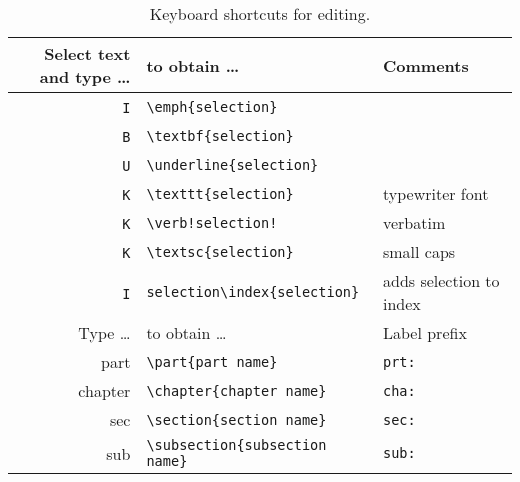\documentclass[10pt]{article}
\begin{document}
\begin{table}
\centering
\caption{Keyboard shortcuts for editing.}
\begin{tabular}{r|l|l}
	Select text and type \dots   & to obtain \dots                        & Comments                \\
	\hline
	\cmdkey~\texttt{I}           & \verb!\emph{selection}!                &                         \\
	\cmdkey~\texttt{B}           & \verb!\textbf{selection}!              &                         \\
	\cmdkey~\texttt{U}           & \verb!\underline{selection}!           &                         \\
	\cmdkey~\texttt{K}           & \verb!\texttt{selection}!              & typewriter font         \\
	\cmdkey~\optkey~\texttt{K}   & \verb=\verb!selection!=                & verbatim                \\
	\cmdkey~\shiftkey~\texttt{K} & \verb!\textsc{selection}!              & small caps              \\
	\ctlkey~\shiftkey~\texttt{I} & \verb!selection\index{selection}!      & adds selection to index \\
	\hline
	Type \dots        & to obtain \dots                            & Label prefix   \\
	\hline
	part\tabkey       & \verb!\part{part name}!                    & \texttt{prt:}           \\
	chapter\tabkey    & \verb!\chapter{chapter name}!              & \texttt{cha:}           \\
	sec\tabkey        & \verb!\section{section name}!              & \texttt{sec:}           \\
	sub\tabkey        & \verb!\subsection{subsection name}!        & \texttt{sub:}           \\

\end{tabular}
\end{table}
\end{document}
